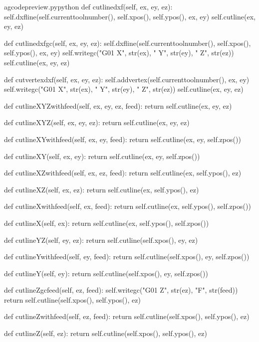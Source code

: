 \documentclass{ltxdoc}
\begin{document}
\lstset{firstnumber=\thegcpy}
\begin{writecode}{a}{gcodepreview.py}{python}
    def cutlinedxf(self, ex, ey, ez):
        self.dxfline(self.currenttoolnumber(), self.xpos(), self.ypos(), ex, ey)
        self.cutline(ex, ey, ez)

    def cutlinedxfgc(self, ex, ey, ez):
        self.dxfline(self.currenttoolnumber(), self.xpos(), self.ypos(), ex, ey)
        self.writegc("G01 X", str(ex), " Y", str(ey), " Z", str(ez))
        self.cutline(ex, ey, ez)

    def cutvertexdxf(self, ex, ey, ez):
        self.addvertex(self.currenttoolnumber(), ex, ey)
        self.writegc("G01 X", str(ex), " Y", str(ey), " Z", str(ez))
        self.cutline(ex, ey, ez)

    def cutlineXYZwithfeed(self, ex, ey, ez, feed):
        return self.cutline(ex, ey, ez)

    def cutlineXYZ(self, ex, ey, ez):
        return self.cutline(ex, ey, ez)

    def cutlineXYwithfeed(self, ex, ey, feed):
        return self.cutline(ex, ey, self.zpos())

    def cutlineXY(self, ex, ey):
        return self.cutline(ex, ey, self.zpos())

    def cutlineXZwithfeed(self, ex, ez, feed):
        return self.cutline(ex, self.ypos(), ez)

    def cutlineXZ(self, ex, ez):
        return self.cutline(ex, self.ypos(), ez)

    def cutlineXwithfeed(self, ex, feed):
        return self.cutline(ex, self.ypos(), self.zpos())

    def cutlineX(self, ex):
        return self.cutline(ex, self.ypos(), self.zpos())

    def cutlineYZ(self, ey, ez):
        return self.cutline(self.xpos(), ey, ez)

    def cutlineYwithfeed(self, ey, feed):
        return self.cutline(self.xpos(), ey, self.zpos())

    def cutlineY(self, ey):
        return self.cutline(self.xpos(), ey, self.zpos())

    def cutlineZgcfeed(self, ez, feed):
        self.writegc("G01 Z", str(ez), "F", str(feed))
        return self.cutline(self.xpos(), self.ypos(), ez)

    def cutlineZwithfeed(self, ez, feed):
        return self.cutline(self.xpos(), self.ypos(), ez)

    def cutlineZ(self, ez):
        return self.cutline(self.xpos(), self.ypos(), ez)

\end{writecode}
\addtocounter{gcpy}{107}
\end{document}
